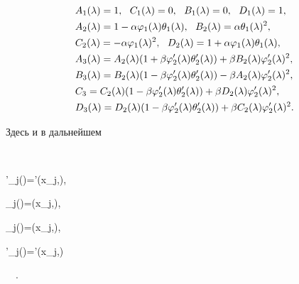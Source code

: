 \begin{align} 


&A_1(\lambda)=1,\ \ C_1(\lambda)=0,\ \ B_1(\lambda)=0, 


\ \ D_1(\lambda)=1, \notag \\ 


% 


&A_2(\lambda)=1-\alpha\varphi_1(\lambda)\theta_1(\lambda),\ \ 


B_2(\lambda)=\alpha\theta_1(\lambda)^2, \notag \\ 


% 


&C_2(\lambda)=-\alpha\varphi_1(\lambda)^2,\ \ 


D_2(\lambda)=1+\alpha\varphi_1(\lambda)\theta_1(\lambda), \notag \\ 


% 


&A_3(\lambda)=A_2(\lambda)(1+\beta\varphi'_2(\lambda) 


\theta'_2(\lambda))+\beta B_2(\lambda) 


\varphi'_2(\lambda)^2, \\ 


% 


&B_3(\lambda)=B_2(\lambda)(1-\beta\varphi'_2(\lambda) 


\theta'_2(\lambda))-\beta A_2(\lambda)\varphi'_2(\lambda)^2,\notag \\ 


% 


&C_3=C_2(\lambda)(1-\beta\varphi'_2(\lambda)\theta'_2(\lambda)) 


+\beta D_2(\lambda)\varphi'_2(\lambda)^2, \notag \\ 


%


&D_3(\lambda)=D_2(\lambda)(1-\beta\varphi'_2(\lambda) 


\theta'_2(\lambda))+\beta C_2(\lambda)\varphi'_2(\lambda)^2.\notag 


\end{align} 


Здесь и в дальнейшем 


$$ 


\theta'_j(\lambda)=\theta'(x_j,\lambda),\ \ 


\varphi_j(\lambda)=\varphi(x_j,\lambda),\ \ 


\theta_j(\lambda)=\theta(x_j,\lambda),\ \ 


\varphi'_j(\lambda)=\varphi'(x_j,\lambda) 


\ \ . 



